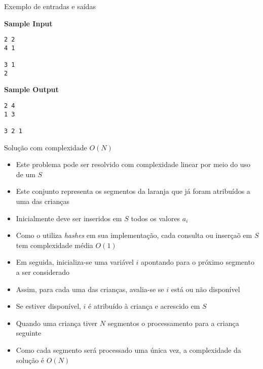 \begin{frame}[fragile]{Exemplo de entradas e saídas}

\begin{minipage}[t]{0.5\textwidth}
\textbf{Sample Input}
\begin{verbatim}
2 2
4 1

3 1
2
\end{verbatim}
\end{minipage}
\begin{minipage}[t]{0.45\textwidth}
\textbf{Sample Output}
\begin{verbatim}
2 4 
1 3 

3 2 1
\end{verbatim}
\end{minipage}
\end{frame}

\begin{frame}[fragile]{Solução com complexidade $O(N)$}

    \begin{itemize}
        \item Este problema pode ser resolvido com complexidade linear por meio do uso de um
             $S$

        \item Este conjunto representa os segmentos da laranja que já foram atribuídos a uma
            das crianças

        \item Inicialmente deve ser inseridos em $S$ todos os valores $a_i$

        \item Como o  utiliza \textit{hashes} em sua implementação,
            cada consulta ou inserçaõ em $S$ tem complexidade média $O(1)$

        \item Em seguida, inicializa-se uma variável $i$ apontando para o próximo segmento
            a ser considerado

        \item Assim, para cada uma das crianças, avalia-se se $i$ está ou não disponível

        \item Se estiver disponível, $i$ é atribuído à criança e acrescido em $S$

        \item Quando uma criança tiver $N$ segmentos o processamento para a criança seguinte

        \item Como cada segmento será processado uma única vez, a complexidade da solução
            é $O(N)$
   \end{itemize}

\end{frame}

